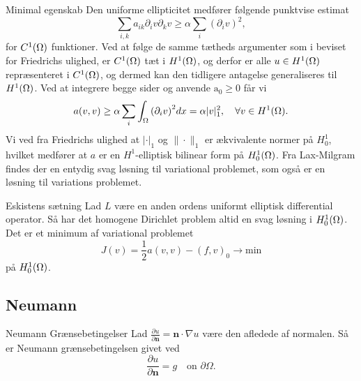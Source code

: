 \begin{frame}{Minimal egenskab}{}
    Den uniforme ellipticitet medfører følgende punktvise estimat
    \[
        \sum_{i,k} a_{ik} \partial_i v \partial_k v \geq \alpha \sum_i {\left( \partial_i v \right)}^2,
    \]
    for $C^1(\Omega)$ funktioner.
    Ved at følge de samme tætheds argumenter som i beviset for Friedrichs ulighed, er $C^1(\Omega)$ tæt i $H^1(\Omega)$, og derfor er alle $u \in H^1(\Omega)$ repræsenteret i $C^1(\Omega)$, og dermed kan den tidligere antagelse generaliseres til $H^1(\Omega)$.
    Ved at integrere begge sider og anvende $\text{a}_0 \geq 0$ får vi
    \begin{equation}
        a(v,v) \geq \alpha \sum_i \int_\Omega {\left(\partial_i v\right)}^2 dx = \alpha |v|^2_1, \quad \forall v \in H^1(\Omega).
    \end{equation}
    Vi ved fra Friedrichs ulighed at $|\cdot|_1$ og $\| \cdot \|_1$ er ækvivalente normer på $H_0^1$,
    hvilket medfører at $a$ er en $H^1$-elliptisk bilinear form på $H_0^1(\Omega)$.
    Fra Lax-Milgram findes der en entydig svag løsning til variational problemet, som også er en løsning til variations problemet.
\end{frame}

\begin{frame}{Eskistens sætning}{}
    Lad $L$ være en anden ordens uniformt elliptisk differential operator. Så har det homogene Dirichlet problem altid en svag løsning i $H_0^1(\Omega)$. Det er et minimum af variational problemet
   \begin{equation}
       J(v)=\frac{1}{2} a(v,v) - {(f, v)}_0 \rightarrow \text{min}
   \end{equation}
   på $H_0^1(\Omega)$.
\end{frame}

\subsection{Neumann}
\begin{frame}{Neumann Grænsebetingelser}{}
    Lad $\frac{\partial u}{\partial \mathbf{n}}= \mathbf{n}\cdot \nabla u$ være den afledede af normalen. Så er Neumann grænsebetingelsen givet ved
    \begin{equation}
        \frac{\partial u}{\partial \mathbf{n}}  = g\quad \text{on } \partial \Omega.
    \end{equation}
\end{frame}

